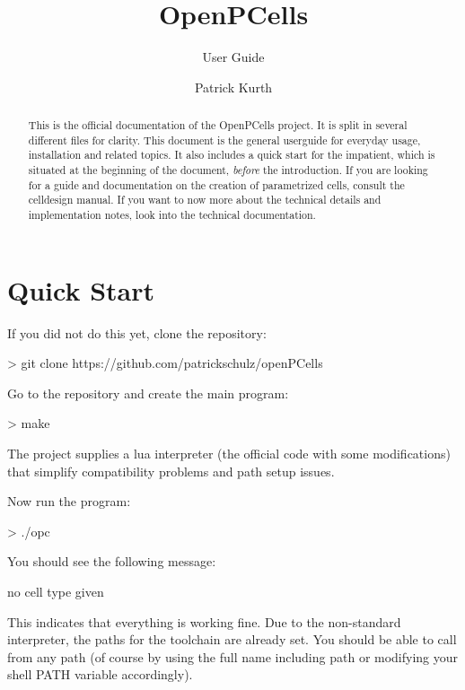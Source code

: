 

\title{OpenPCells}
\subtitle{User Guide}
\author{Patrick Kurth}



\maketitle
\begin{abstract}
    \noindent This is the official documentation of the OpenPCells project.  It is split in several different files for clarity. 
    This document is the general userguide for everyday usage, installation and related topics. It also includes a quick start for the impatient, which is situated
    at the beginning of the document, \emph{before} the introduction.
    If you are looking for a guide and documentation on the creation of parametrized cells, consult the celldesign manual.
    If you want to now more about the technical details and implementation notes, look into the technical documentation.
\end{abstract}

\tableofcontents

\section{Quick Start}
If you did not do this yet, clone the repository:
\begin{shellcode}
    > git clone https://github.com/patrickschulz/openPCells
\end{shellcode}
Go to the repository and create the main program:
\begin{shellcode}
    > make
\end{shellcode}
The project supplies a lua interpreter (the official code with some modifications) that simplify compatibility problems and path setup issues.

Now run the program:
\begin{shellcode}
    > ./opc
\end{shellcode}
You should see the following message:
\begin{shellcode}
    no cell type given
\end{shellcode}
This indicates that everything is working fine. Due to the non-standard interpreter, the paths for the toolchain are already set. You should be able to call
 from any path (of course by using the full name including path or modifying your shell PATH variable accordingly).

